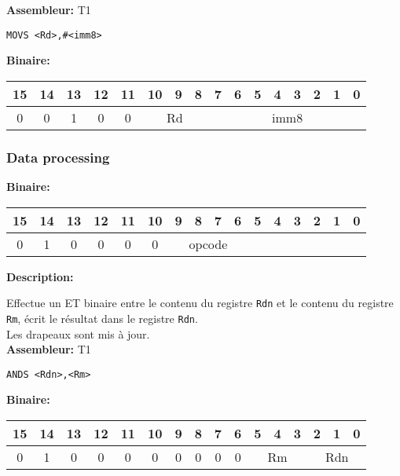 \documentclass{article}
\newcounter{subsubsubsection}[subsubsection]
\begin{document}
\textbf{Assembleur:} T1

\begin{lstlisting}
MOVS <Rd>,#<imm8>
\end{lstlisting}

\textbf{Binaire:}\\

\begin{tabular}{| c c c c c c c c c c c c c c c c |}
\hline
15 & 14 & 13 & \multicolumn{1}{|c}{12} & 11 & \multicolumn{1}{|c}{10} & 9 & 8 & \multicolumn{1}{|c}{7} & 6 & 5 & 4 & 3 & 2 & 1 & 0 \\
\hline
0 & 0 & 1 & \multicolumn{1}{|c}{0} & 0 & \multicolumn{3}{|c|}{Rd} & \multicolumn{8}{|c|}{imm8} \\
\hline
\end{tabular}


\subsubsection{Data processing}

\textbf{Binaire:}\\

\begin{tabular}{| c c c c c c c c c c c c c c c c |}
\hline
15 & 14 & 13 & 12 & 11 & 10 & \multicolumn{1}{|c}{9} & 8 & 7 & 6 & \multicolumn{1}{|c}{5} & 4 & 3 & 2 & 1 & 0 \\
\hline
0 & 1 & 0 & 0 & 0 & 0 & \multicolumn{4}{|c}{opcode} & \multicolumn{6}{|c|}{} \\
\hline
\end{tabular}


\textbf{Description: }

Effectue un ET binaire entre le contenu du registre \texttt{Rdn} et le contenu du registre \texttt{Rm}, écrit le résultat dans le registre \texttt{Rdn}.\\
Les drapeaux sont mis à jour.\\

\textbf{Assembleur:} T1

\begin{lstlisting}
ANDS <Rdn>,<Rm>
\end{lstlisting}

\textbf{Binaire:}\\

\begin{tabular}{| c c c c c c c c c c c c c c c c |}
\hline
15 & 14 & 13 & 12 & 11 & 10 & \multicolumn{1}{|c}{9} & 8 & 7 & 6 & \multicolumn{1}{|c}{5} & 4 & 3 & \multicolumn{1}{|c}{2} & 1 & 0 \\
\hline
0 & 1 & 0 & 0 & 0 & 0 & \multicolumn{1}{|c}{0} & 0 & 0 & 0 & \multicolumn{3}{|c}{Rm} & \multicolumn{3}{|c|}{Rdn} \\
\hline
\end{tabular}
\end{document}
